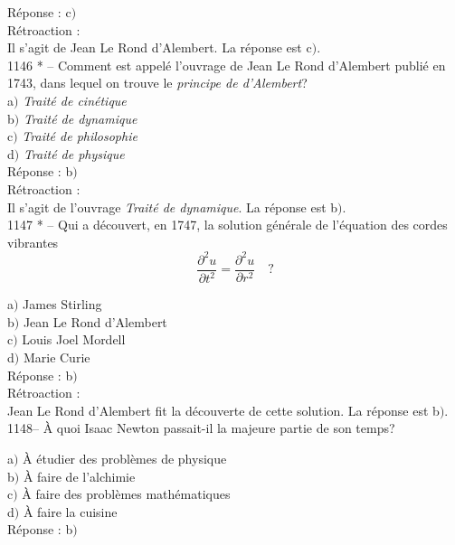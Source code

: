 ﻿\documentclass[letterpaper, 12pt]{article}
\begin{document}
R\'eponse : c$)$\\

R\'etroaction : \\
Il s'agit de Jean Le Rond d'Alembert. La r\'eponse est c$)$. \\

1146 * -- Comment est appel\'e l'ouvrage de Jean Le Rond d'Alembert publi\'e
en 1743, dans lequel on trouve
le {\sl principe de d'Alembert}?\\

a$)$ {\sl Trait\'e de cin\'etique}  \\
b$)$ {\sl Trait\'e de dynamique} \\
c$)$ {\sl Trait\'e de philosophie}  \\
d$)$ {\sl Trait\'e de physique}  \\

R\'eponse : b$)$\\

R\'etroaction : \\
Il s'agit de l'ouvrage {\sl Trait\'e de dynamique}. La r\'eponse est b$)$.
\\

1147 * -- Qui a d\'ecouvert, en 1747, la solution g\'en\'erale de
l'\'equation des cordes vibrantes
$$\displaystyle{\frac{\partial^2u}{\partial t^2}=\frac{\partial^2u}{\partial
r^2}}\quad?$$

a$)$ James Stirling \\
b$)$ Jean Le Rond d'Alembert \\
c$)$ Louis Joel Mordell  \\
d$)$ Marie Curie  \\

R\'eponse : b$)$\\

R\'etroaction : \\
Jean Le Rond d'Alembert fit la d\'ecouverte de cette solution. La r\'eponse
est b$)$.\\

1148-- \`A quoi Isaac Newton passait-il la majeure partie de son
temps?

a$)$ \`A \'etudier des probl\`emes de physique \\
b$)$ \`A faire de l'alchimie \\
c$)$ \`A faire des probl\`emes math\'ematiques \\
d$)$ \`A faire la cuisine  \\

R\'eponse : b$)$\\
\end{document}
